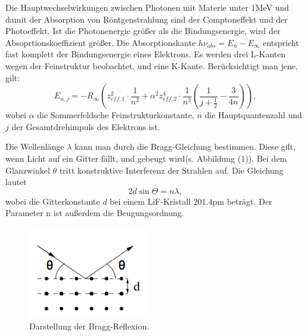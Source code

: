 \noindent Die Hauptwechselwirkungen zwischen Photonen mit Materie unter $1$MeV und damit der Absorption von Röntgenstrahlung sind der Comptoneffekt und der Photoeffekt. 
Ist die Photonenergie größer als die Bindungsenergie, wird der Absoprtionskoeffizient größer.
Die Absorptionskante $h \nu_{abs} = E_n - E_{\infty}$ entspricht fast komplett der Bindungsenergie eines Elektrons.
Es werden drei L-Kanten wegen der Feinstruktur beobachtet, und eine K-Kante. Berücksichtigt man jene, gilt:
\begin{equation}
E_{n,j} = -R_{\infty} \left( z_{eff,1}^2 \cdot \frac{1}{n^2} + \alpha^2 z_{eff,2}^4 \cdot \frac{1}{n^3}
\left(\frac{1}{j+ \frac{1}{2}} - \frac{3}{4n} \right) \right) ,
\end{equation}
wobei $\alpha$ die Sommerfeldsche Feinstrukturkonstante, $n$ die Hauptquantenzahl und $j$ der Gesamtdrehimpuls des
Elektrons ist.

\noindent Die Wellenlänge $\lambda$ kann man durch die Bragg-Gleichung bestimmen. Diese gilt, wenn Licht auf ein Gitter fällt, und gebeugt wird(s. Abbildung (1)).
Bei dem Glanzwinkel $\theta$ tritt konstruktive Interferenz der Strahlen auf. 
Die Gleichung lautet
\begin{equation}
  2d \sin{\Theta} = n \lambda ,
\end{equation}
wobei die Gitterkonstante $d$ bei einem LiF-Kristall $201.4 \si{\pm}$ beträgt. Der Parameter n ist außerdem die Beugungsordnung.

\begin{figure}[H]
  \centering
  \includegraphics[height=4cm]{bragg.PNG}
  \caption{Darstellung der Bragg-Reflexion. \cite[S.2]{kent}}
\end{figure}
